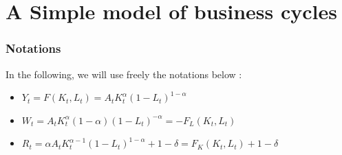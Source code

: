 \documentclass[12pt]{article}
\begin{document}
\section{A Simple model of business cycles}
\subsubsection*{Notations}
In the following, we will use freely the notations below :
\begin{itemize}
    \item $Y_t = F(K_t, L_t) = A_t K_t^{\alpha}(1 - L_t)^{1 - \alpha}$
    \item $W_t = A_t K_t^{\alpha} (1 - \alpha)(1 - L_t)^{-\alpha} = - F_L(K_t,L_t)$
    \item $R_t = \alpha A_t K_t^{\alpha -1 } (1 - L_t)^{1 - \alpha} + 1 - \delta = F_K(K_t, L_t) + 1 - \delta$
\end{itemize}
\end{document}
